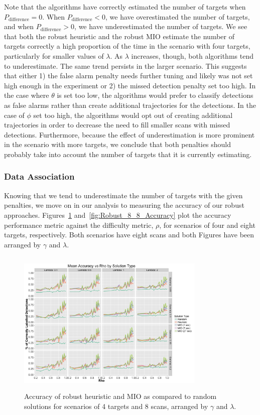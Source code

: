 \documentclass[journal]{IEEEtran}
\begin{document}
Note that the algorithms have correctly estimated the number of targets when $P_{\text{difference}} = 0$. When $P_{\text{difference}} < 0$, we have overestimated the number of targets, and when $P_{\text{difference}} > 0$, we have underestimated the number of targets. We see that both the robust heuristic and the robust MIO estimate the number of targets correctly a high proportion of the time in the scenario with four targets, particularly for smaller values of $\lambda$. As $\lambda$ increases, though, both algorithms tend to underestimate. The same trend persists in the larger scenario. This suggests that either 1) the false alarm penalty needs further tuning and likely was not set high enough in the experiment or 2) the missed detection penalty set too high. In the case where $\theta$ is set too low, the algorithms would prefer to classify detections as false alarms rather than create additional trajectories for the detections. In the case of $\phi$ set too high, the algorithms would opt out of creating additional trajectories in order to decrease the need to fill smaller scans with missed detections. Furthermore, because the effect of underestimation is more prominent in the scenario with more targets, we conclude that both penalties should probably take into account the number of targets that it is currently estimating.

\subsubsection{Data Association}
Knowing that we tend to underestimate the number of targets with the given penalties, we move on in our analysis to measuring the accuracy of our robust approaches. Figures~\ref{fig:Robust_4_8_Accuracy} and~\ref{fig:Robust_8_8_Accuracy} plot the accuracy performance metric against the difficulty metric, $\rho$, for scenarios of four and eight targets, respectively. Both scenarios have eight scans and both Figures have been arranged by $\gamma$ and $\lambda$.
\begin{figure}[h]
  \centering
  \includegraphics[width=9cm, height=7cm]{4_8_Accuracy}
  \caption{Accuracy of robust heuristic and MIO as compared to random solutions for scenarios of 4 targets and 8 scans, arranged by $\gamma$ and $\lambda$.}
  \label{fig:Robust_4_8_Accuracy}
\end{figure}
\end{document}
